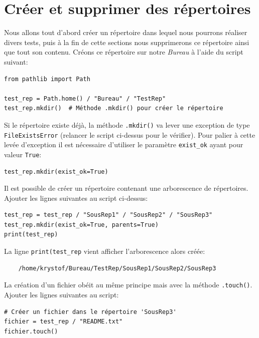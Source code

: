 \documentclass[a4paper,11pt]{book}
\begin{document}
\section{Créer et supprimer des répertoires}
Nous allons tout d'abord créer un répertoire dans lequel nous pourrons réaliser divers tests, puis à la fin de cette sections nous supprimerons ce répertoire ainsi que tout son contenu. Créons ce répertoire sur notre \textit{Bureau} à l'aide du script suivant:
\begin{lstlisting}[caption=Créer un répertoire sur le bureau de l'utilisateur]
from pathlib import Path

test_rep = Path.home() / "Bureau" / "TestRep"
test_rep.mkdir()  # Méthode .mkdir() pour créer le répertoire
\end{lstlisting}
\medskip

Si le répertoire existe déjà, la méthode \texttt{.mkdir()} va lever une exception de type \texttt{FileExistsError} (relancer le script ci-dessus pour le vérifier). Pour palier à cette levée d'exception il est nécessaire d'utiliser le paramètre \texttt{exist\_ok} ayant pour valeur \texttt{True}:
\begin{lstlisting}[caption=Avec \texttt{exist\_ok=True}]
test_rep.mkdir(exist_ok=True)
\end{lstlisting}
\medskip

Il est possible de créer un répertoire contenant une arborescence de répertoires. Ajouter les lignes suivantes au script ci-dessus:
\begin{lstlisting}[caption=Créer une arborescence de répertoires]
test_rep = test_rep / "SousRep1" / "SousRep2" / "SousRep3"
test_rep.mkdir(exist_ok=True, parents=True)
print(test_rep)
\end{lstlisting}
\medskip

La ligne \texttt{print(test\_rep} vient afficher l'arborescence alors créée:
\begin{verbatim}
    /home/krystof/Bureau/TestRep/SousRep1/SousRep2/SousRep3
\end{verbatim}
\medskip

La création d'un fichier obéit au même principe mais avec la méthode \texttt{.touch()}. Ajouter les lignes suivantes au script:
\begin{lstlisting}[caption=Créer un fichier]
# Créer un fichier dans le répertoire 'SousRep3'
fichier = test_rep / "README.txt"
fichier.touch()
\end{lstlisting}
\medskip
\end{document}

